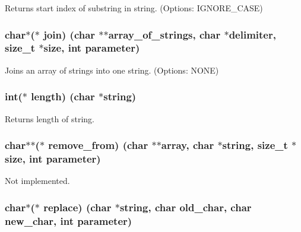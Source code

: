 Returns start index of substring in string. (Options\+: I\+G\+N\+O\+R\+E\+\_\+\+C\+A\+S\+E) 

\hypertarget{struct_string___utils_ac942d3f461814d4649f55f5bf577b954}{}
\subsubsection[{join}]{\setlength{\rightskip}{0pt plus 5cm}char$\ast$($\ast$ join) (char $\ast$$\ast$array\+\_\+of\+\_\+strings, char $\ast$delimiter, size\+\_\+t $\ast$size, int parameter)}\label{struct_string___utils_ac942d3f461814d4649f55f5bf577b954}


Joins an array of strings into one string. (Options\+: N\+O\+N\+E) 

\hypertarget{struct_string___utils_a58de371476767a271dc657f57f5bd5da}{}
\subsubsection[{length}]{\setlength{\rightskip}{0pt plus 5cm}int($\ast$ length) (char $\ast$string)}\label{struct_string___utils_a58de371476767a271dc657f57f5bd5da}


Returns length of string. 

\hypertarget{struct_string___utils_abfe28f997f8aeb3f694f6077b2074fe5}{}
\subsubsection[{remove\+\_\+from}]{\setlength{\rightskip}{0pt plus 5cm}char$\ast$$\ast$($\ast$ remove\+\_\+from) (char $\ast$$\ast$array, char $\ast$string, size\+\_\+t $\ast$size, int parameter)}\label{struct_string___utils_abfe28f997f8aeb3f694f6077b2074fe5}


Not implemented. 

\hypertarget{struct_string___utils_ab981dab5e80222905fd97d838ad82219}{}
\subsubsection[{replace}]{\setlength{\rightskip}{0pt plus 5cm}char$\ast$($\ast$ replace) (char $\ast$string, char old\+\_\+char, char new\+\_\+char, int parameter)}\label{struct_string___utils_ab981dab5e80222905fd97d838ad82219}


